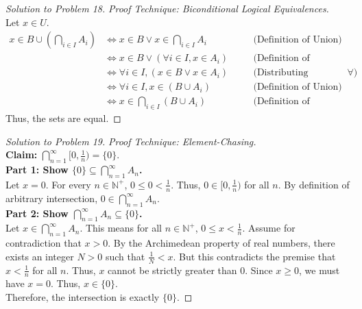 \documentclass[12pt]{article}
\theoremstyle{definition}
\begin{document}
\begin{proof}[Solution to Problem 18]
\textit{Proof Technique: Biconditional Logical Equivalences.} \\
Let $x \in U$.
\begin{align*}
x \in B \cup \left(\bigcap_{i \in I} A_i\right) &\iff x \in B \lor x \in \bigcap_{i \in I} A_i \quad &&\text{(Definition of Union)} \\
&\iff x \in B \lor (\forall i \in I, x \in A_i) \quad &&\text{(Definition of Arbitrary Intersection)} \\
&\iff \forall i \in I, (x \in B \lor x \in A_i) \quad &&\text{(Distributing independent statement into } \forall \text{)} \\
&\iff \forall i \in I, x \in (B \cup A_i) \quad &&\text{(Definition of Union)} \\
&\iff x \in \bigcap_{i \in I} (B \cup A_i) \quad &&\text{(Definition of Arbitrary Intersection)}
\end{align*}
Thus, the sets are equal.
\end{proof}

\begin{proof}[Solution to Problem 19]
\textit{Proof Technique: Element-Chasing.} \\
\textbf{Claim:} $\bigcap_{n=1}^\infty [0, \frac{1}{n}) = \{0\}$. \\
\textbf{Part 1: Show $\{0\} \subseteq \bigcap_{n=1}^\infty A_n$.} \\
Let $x = 0$. For every $n \in \mathbb{N}^+$, $0 \le 0 < \frac{1}{n}$. Thus, $0 \in [0, \frac{1}{n})$ for all $n$. By definition of arbitrary intersection, $0 \in \bigcap_{n=1}^\infty A_n$. \\
\textbf{Part 2: Show $\bigcap_{n=1}^\infty A_n \subseteq \{0\}$.} \\
Let $x \in \bigcap_{n=1}^\infty A_n$. This means for all $n \in \mathbb{N}^+$, $0 \le x < \frac{1}{n}$. 
Assume for contradiction that $x > 0$. By the Archimedean property of real numbers, there exists an integer $N > 0$ such that $\frac{1}{N} < x$. But this contradicts the premise that $x < \frac{1}{n}$ for all $n$. Thus, $x$ cannot be strictly greater than 0. Since $x \ge 0$, we must have $x = 0$. Thus, $x \in \{0\}$. \\
Therefore, the intersection is exactly $\{0\}$.
\end{proof}
\end{document}
